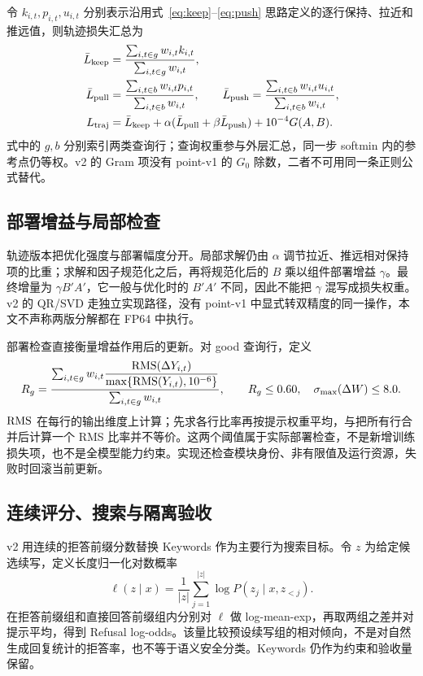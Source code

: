 令 $k_{i,t},p_{i,t},u_{i,t}$ 分别表示沿用式~\eqref{eq:keep}--\eqref{eq:push} 思路定义的逐行保持、拉近和推远值，则轨迹损失汇总为
\begin{align}
 \bar L_{\rm keep}&=\frac{\sum_{i,t\in g}w_{i,t}k_{i,t}}
 {\sum_{i,t\in g}w_{i,t}},\nonumber\\
 \bar L_{\rm pull}&=\frac{\sum_{i,t\in b}w_{i,t}p_{i,t}}
 {\sum_{i,t\in b}w_{i,t}},\qquad
 \bar L_{\rm push}=\frac{\sum_{i,t\in b}w_{i,t}u_{i,t}}
 {\sum_{i,t\in b}w_{i,t}},\nonumber\\
 L_{\rm traj}&=\bar L_{\rm keep}
  +\alpha(\bar L_{\rm pull}+\beta\bar L_{\rm push})+10^{-4}G(A,B).
 \label{eq:trajectory-loss}
\end{align}
式中的 $g,b$ 分别索引两类查询行；查询权重参与外层汇总，同一步 softmin 内的参考点仍等权。v2 的 Gram 项没有 point-v1 的 $G_0$ 除数，二者不可用同一条正则公式替代。

\subsection{部署增益与局部检查}

轨迹版本把优化强度与部署幅度分开。局部求解仍由 $\alpha$ 调节拉近、推远相对保持项的比重；求解和因子规范化之后，再将规范化后的 $B$ 乘以组件部署增益 $\gamma$。最终增量为 $\gamma B'A'$，它一般与优化时的 $B'A'$ 不同，因此不能把 $\gamma$ 混写成损失权重。v2 的 QR/SVD 走独立实现路径，没有 point-v1 中显式转双精度的同一操作，本文不声称两版分解都在 FP64 中执行。

部署检查直接衡量增益作用后的更新。对 good 查询行，定义
\begin{equation}
 R_g=\frac{\sum_{i,t\in g}w_{i,t}
 \dfrac{\operatorname{RMS}(\Delta Y_{i,t})}
 {\max\{\operatorname{RMS}(Y_{i,t}),10^{-6}\}}}
 {\sum_{i,t\in g}w_{i,t}},\qquad
 R_g\leq0.60,\quad \sigma_{\max}(\Delta W)\leq8.0.
 \label{eq:deployment-check}
\end{equation}
$\operatorname{RMS}$ 在每行的输出维度上计算；先求各行比率再按提示权重平均，与把所有行合并后计算一个 RMS 比率并不等价。这两个阈值属于实际部署检查，不是新增训练损失项，也不是全模型能力约束。实现还检查模块身份、非有限值及运行资源，失败时回滚当前更新。

\subsection{连续评分、搜索与隔离验收}

v2 用连续的拒答前缀分数替换 Keywords 作为主要行为搜索目标。令 $z$ 为给定候选续写，定义长度归一化对数概率
\begin{equation}
 \ell(z\mid x)=\frac{1}{|z|}\sum_{j=1}^{|z|}
 \log P(z_j\mid x,z_{<j}).
 \label{eq:prefix-likelihood}
\end{equation}
在拒答前缀组和直接回答前缀组内分别对 $\ell$ 做 log-mean-exp，再取两组之差并对提示平均，得到 Refusal log-odds。该量比较预设续写组的相对倾向，不是对自然生成回复统计的拒答率，也不等于语义安全分类。Keywords 仍作为约束和验收量保留。

